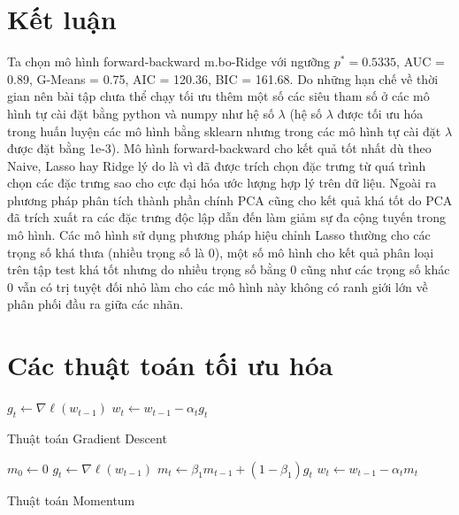 \documentclass[14pt, a4paper]{article}
\theoremstyle{sltheorem}
\theoremstyle{soltheorem}
\begin{document}
    \section*{Kết luận}
    Ta chọn mô hình forward-backward m.bo-Ridge với ngưỡng $p^*=0.5335$, AUC = 0.89, G-Means = 0.75, AIC = 120.36, BIC = 161.68.
    Do những hạn chế về thời gian nên bài tập chưa thể chạy tối ưu thêm một số các siêu tham số ở các mô hình tự cài đặt bằng python và numpy như hệ số $\lambda$ (hệ số $\lambda$ được tối ưu hóa trong huấn luyện các mô hình bằng sklearn nhưng trong các mô hình tự cài đặt $\lambda$ được đặt bằng 1e-3).
    Mô hình forward-backward cho kết quả tốt nhất dù theo Naive, Lasso hay Ridge lý do là vì đã được trích chọn đặc trưng từ quá trình chọn các đặc trưng sao cho cực đại hóa ước lượng hợp lý trên dữ liệu.
    Ngoài ra phương pháp phân tích thành phần chính PCA cũng cho kết quả khá tốt do PCA đã trích xuất ra các đặc trưng độc lập dẫn đến làm giảm sự đa cộng tuyến trong mô hình.
    Các mô hình sử dụng phương pháp hiệu chỉnh Lasso thường cho các trọng số khá thưa (nhiều trọng số là 0), một số mô hình cho kết quả phân loại trên tập test khá tốt nhưng do nhiều trọng số bằng 0 cũng như các trọng số khác 0 vẫn có trị tuyệt đối nhỏ làm cho các mô hình này không có ranh giới lớn về phân phối đầu ra giữa các nhãn.
\newpage
\printbibliography[title={TÀI LIỆU THAM KHẢO}]

\newpage
\appendix

\section{Các thuật toán tối ưu hóa} \label{Optimization-Algorithms}


\begin{algorithm}[h!]
    \DontPrintSemicolon

     {
        $g_t \gets \nabla \ell(w_{t-1})$\;
        $w_t \gets w_{t-1} - \alpha_t g_t$
    }
    \;
    \caption{Thuật toán Gradient Descent}
\end{algorithm}


\begin{algorithm}[h!]
    \DontPrintSemicolon
    $m_0 \gets 0$\;
     {
        $g_t \gets \nabla \ell(w_{t-1})$\;
        $m_t \gets \beta_1 m_{t-1} + (1-\beta_1) g_t$\;
        $w_t \gets w_{t-1} - \alpha_t m_t$\;
    }
    \;
    \caption{Thuật toán Momentum}
\end{algorithm}
\end{document}
